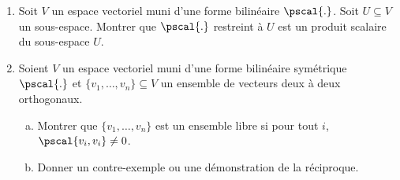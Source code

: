 \begin{enumerate}

\item Soit $V$ un espace vectoriel muni d'une forme bilinéaire $\pscal{.}$. Soit $U \subseteq V$ un sous-espace. Montrer que $\pscal{.}$ restreint à $U$ est un produit scalaire du sous-espace $U$. 
\item Soient $V$ un espace vectoriel muni d'une forme bilinéaire symétrique $\pscal{.}$ et $\{v_1,\dots,v_n\} \subseteq V$ un ensemble de
vecteurs deux à deux orthogonaux. 
  \begin{enumerate}[a)]
  \item   Montrer que $\{v_1,\dots,v_n\}$ est un ensemble libre si pour tout $i$, 
 $\pscal{v_i,v_i} \neq  0$.  
\item  Donner un contre-exemple ou une démonstration de la réciproque. 
\end{enumerate}



\end{enumerate}
